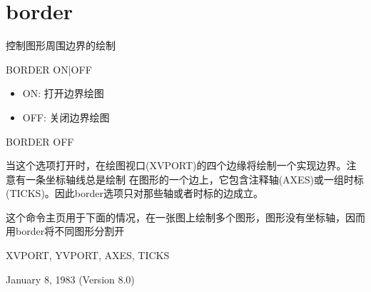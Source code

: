 \section{border}
\label{cmd:border}

控制图形周围边界的绘制

BORDER {ON|OFF}

\begin{itemize}
\item ON: 打开边界绘图
\item OFF: 关闭边界绘图 
\end{itemize}

BORDER OFF

当这个选项打开时，在绘图视口(XVPORT)的四个边缘将绘制一个实现边界。注意有一条坐标轴线总是绘制
在图形的一个边上，它包含注释轴(AXES)或一组时标(TICKS)。因此border选项只对那些轴或者时标的边成立。

这个命令主页用于下面的情况，在一张图上绘制多个图形，图形没有坐标轴，因而用border将不同图形分割开

XVPORT, YVPORT, AXES, TICKS

January 8, 1983 (Version 8.0)

